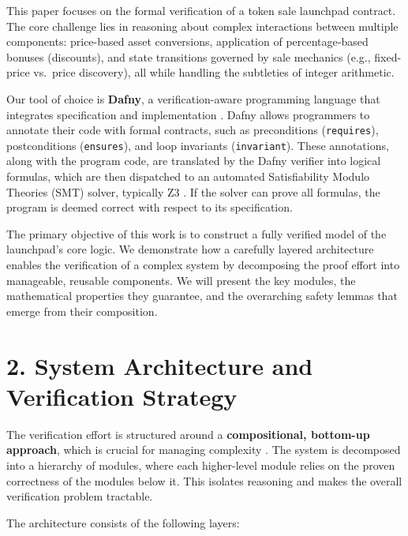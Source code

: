 \documentclass[
  english,
  onecolumn]{article}
\begin{document}
This paper focuses on the formal verification of a token sale launchpad
contract. The core challenge lies in reasoning about complex
interactions between multiple components: price-based asset conversions,
application of percentage-based bonuses (discounts), and state
transitions governed by sale mechanics (e.g., fixed-price vs.~price
discovery), all while handling the subtleties of integer arithmetic.

Our tool of choice is \textbf{Dafny}, a verification-aware programming
language that integrates specification and implementation
\citep{leino2010dafny}. Dafny allows programmers to annotate their code
with formal contracts, such as preconditions (\texttt{requires}),
postconditions (\texttt{ensures}), and loop invariants
(\texttt{invariant}). These annotations, along with the program code,
are translated by the Dafny verifier into logical formulas, which are
then dispatched to an automated Satisfiability Modulo Theories (SMT)
solver, typically Z3 \citep{demoura2008z3}. If the solver can prove all
formulas, the program is deemed correct with respect to its
specification.

The primary objective of this work is to construct a fully verified
model of the launchpad's core logic. We demonstrate how a carefully
layered architecture enables the verification of a complex system by
decomposing the proof effort into manageable, reusable components. We
will present the key modules, the mathematical properties they
guarantee, and the overarching safety lemmas that emerge from their
composition.

\section{2. System Architecture and Verification
Strategy}\label{system-architecture-and-verification-strategy}

The verification effort is structured around a \textbf{compositional,
bottom-up approach}, which is crucial for managing complexity
\citep{almeida2007compositional, chen2021compositional}. The system is
decomposed into a hierarchy of modules, where each higher-level module
relies on the proven correctness of the modules below it. This isolates
reasoning and makes the overall verification problem tractable.

The architecture consists of the following layers:
\end{document}
